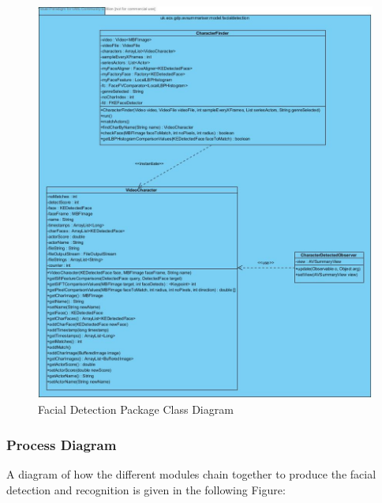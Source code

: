 \begin{figure}[h1]
\begin{center}
 \includegraphics[trim = 0mm 0mm 0mm 0mm, clip,
 scale=0.5]{Images/facialdetection_package_class_diagram.jpg}
  \caption{Facial Detection Package Class Diagram}
 \label{fig:DrWhoFD}
 \end{center}
\end{figure}

\newpage
\subsubsection{Process Diagram}
A diagram of how the different modules chain together to produce the facial detection and recognition is given in the following Figure:

